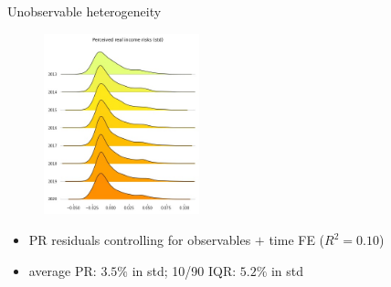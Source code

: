 \documentclass{beamer}
\begin{document}
\begin{frame}{Unobservable heterogeneity}
	\begin{figure}
		\centering
		\label{rincstd_hist}
			\includegraphics[width=0.4\textwidth]{figures/joy_rincstd.jpg}
	\end{figure}
	\begin{itemize}
		\item  PR residuals controlling for observables $+$ time FE ($R^2=0.10$) 
		\item average PR:  $3.5\%$ in std; 10/90 IQR: $5.2\%$ in std \quad \hyperlink{appendix:incstd}{}  
	\end{itemize}
\end{frame}
\end{document}
